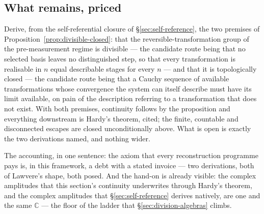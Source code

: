 \subsection{What remains, priced}

\begin{openproblem}\label{op:limit-realisability}
Derive, from the self-referential closure of \S\ref{sec:self-reference}, the two premises of
Proposition~\ref{prop:divisible-closed}: that the reversible-transformation group of the
pre-measurement regime is divisible --- the candidate route being that no selected basis leaves no
distinguished step, so that every transformation is realisable in $n$ equal describable stages for
every $n$ --- and that it is topologically closed --- the candidate route being that a Cauchy
sequence of available transformations whose convergence the system can itself describe must have its
limit available, on pain of the description referring to a transformation that does not exist. With
both premises, continuity follows by the proposition and everything downstream is Hardy's theorem,
cited; the finite, countable and disconnected escapes are closed unconditionally above. What is open
is exactly the two derivations named, and nothing wider.
\end{openproblem}

The accounting, in one sentence: the axiom that every reconstruction programme pays is, in this
framework, a debt with a stated invoice --- two derivations, both of Lawvere's shape, both posed. And
the hand-on is already visible: the complex amplitudes that this section's continuity underwrites
through Hardy's theorem, and the complex amplitudes that \S\ref{sec:self-reference} derives natively,
are one and the same $\mathbb{C}$ --- the floor of the ladder that \S\ref{sec:division-algebras}
climbs.
